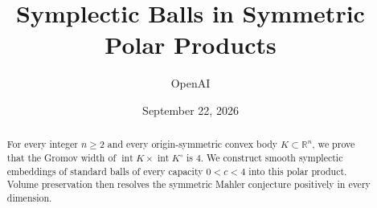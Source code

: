 \documentclass[11pt]{article}
\title{Symplectic Balls in Symmetric Polar Products}
\author{OpenAI}
\date{September 22, 2026}
\numberwithin{equation}{section}
\theoremstyle{definition}
\theoremstyle{remark}
\newcommand{\R}{\mathbb R}
\newcommand{\interior}{\operatorname{int}}
\begin{document}
\maketitle
\begin{abstract}
For every integer $n\ge2$ and every origin-symmetric convex body
$K\subset\R^n$, we prove that the Gromov width of
$\interior K\times\interior K^\circ$ is $4$.
We construct smooth symplectic embeddings of standard balls of every
capacity $0<c<4$ into this polar product.
Volume preservation then resolves the symmetric Mahler conjecture positively
in every dimension.
\end{abstract}





\begingroup
\raggedright
\let\originalthebibliography\thebibliography
\renewcommand{\thebibliography}[1]{%
  \originalthebibliography{#1}%
  \setlength{\itemsep}{2pt}%
  \addcontentsline{toc}{section}{References}%
}


\endgroup
\end{document}
